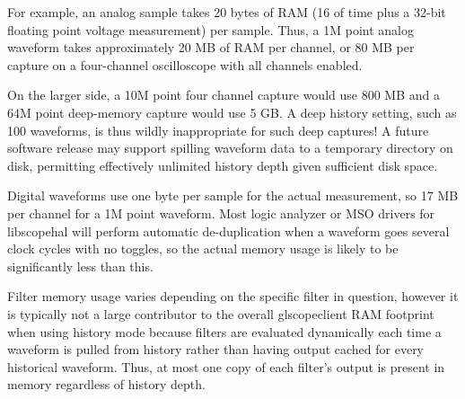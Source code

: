 For example, an analog sample takes 20 bytes of RAM (16 of time plus a 32-bit floating point voltage measurement) per
sample. Thus, a 1M point analog waveform takes approximately 20 MB of RAM per channel, or 80 MB per capture on a
four-channel oscilloscope with all channels enabled.

On the larger side, a 10M point four channel capture would use 800 MB and a 64M point deep-memory capture would use 5
GB. A deep history setting, such as 100 waveforms, is thus wildly inappropriate for such deep captures! A future
software release may support spilling waveform data to a temporary directory on disk, permitting effectively unlimited
history depth given sufficient disk space.

Digital waveforms use one byte per sample for the actual measurement, so 17 MB per channel for a 1M point waveform.
Most logic analyzer or MSO drivers for libscopehal will perform automatic de-duplication when a waveform goes several
clock cycles with no toggles, so the actual memory usage is likely to be significantly less than this.

Filter memory usage varies depending on the specific filter in question, however it is typically not a large
contributor to the overall glscopeclient RAM footprint when using history mode because filters are evaluated
dynamically each time a waveform is pulled from history rather than having output cached for every historical waveform.
Thus, at most one copy of each filter's output is present in memory regardless of history depth.
